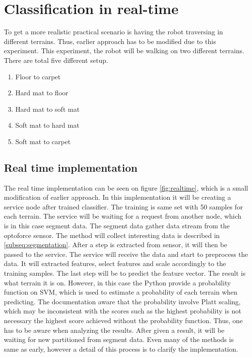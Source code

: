 \documentclass[USenglish]{ifimaster}  %
\begin{document}
\section{Classification in real-time} \label{sec:realtime}
To get a more realistic practical scenario is having the robot traversing in different terrains. Thus, earlier approach has to be modified due to this experiment. This experiment, the robot will be walking on two different terrains. There are total five different setup.
	
	
	\begin{enumerate}
		\item Floor to carpet
		\item Hard mat to floor
		\item Hard mat to soft mat
		\item Soft mat to hard mat
		\item Soft mat to carpet
	\end{enumerate}
	
\subsection{Real time implementation}
The real time implementation can be seen on figure \ref{fig:realtime}, which is a small modification of earlier approach. In this implementation it will be creating a service node after trained classifier. The training is same set with 50 samples for each terrain. The service will be waiting for a request from another node, which is in this case segment data. The segment data gather data stream from the optoforce sensor. The method will collect interesting data is described in \ref{subseq:segmentation}. After a step is extracted from sensor, it will then be passed to the service. The service will receive the data and start to preprocess the data. It will extracted features, select features and scale accordingly to the training samples. The last step will be to predict the feature vector. The result is what terrain it is on. However, in this case the Python provide a probability function on SVM, which is used to estimate a probability of each terrain when predicting. The documentation aware that the probability involve Platt scaling, which may be inconsistent with the scores such as the highest probability is not necessary the highest score achieved without the probability function. Thus, one has to be aware when analyzing the results. After given a result, it will be waiting for new partitioned from segment data. Even many of the methods is same as early, however a detail of this process is to clarify the implementation.
	
\end{document}
